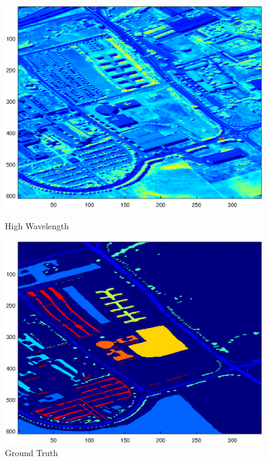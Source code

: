 \documentclass[12pt]{article}
\begin{document}
\begin{figure}
\begin{minipage}{.45\textwidth}
  \includegraphics[width=\linewidth]{./Images/paviaFull/band81.eps}
  \caption{High Wavelength}
  \label{PaviaHigh}
\end{minipage}\hfill
\begin{minipage}{.45\textwidth}
  \includegraphics[width=\linewidth]{./Images/paviaFull/groundtruth.eps}
  \caption{Ground Truth}
  \label{PaviaGroundTruth}
\end{minipage}
\end{figure}
\end{document}
